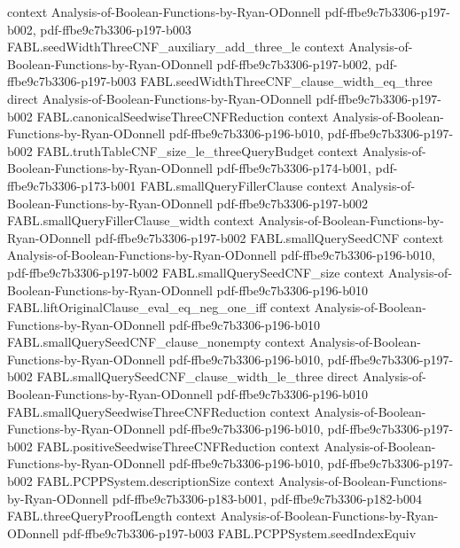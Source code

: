 \begin{theorem}
  {context}
  {Analysis-of-Boolean-Functions-by-Ryan-ODonnell}
  {pdf-ffbe9c7b3306-p197-b002,
    pdf-ffbe9c7b3306-p197-b003}
\proofstep
  {FABL.seedWidthThreeCNF_auxiliary_add_three_le}
  {context}
  {Analysis-of-Boolean-Functions-by-Ryan-ODonnell}
  {pdf-ffbe9c7b3306-p197-b002,
    pdf-ffbe9c7b3306-p197-b003}
\proofstep
  {FABL.seedWidthThreeCNF_clause_width_eq_three}
  {direct}
  {Analysis-of-Boolean-Functions-by-Ryan-ODonnell}
  {pdf-ffbe9c7b3306-p197-b002}
\proofstep
  {FABL.canonicalSeedwiseThreeCNFReduction}
  {context}
  {Analysis-of-Boolean-Functions-by-Ryan-ODonnell}
  {pdf-ffbe9c7b3306-p196-b010,
    pdf-ffbe9c7b3306-p197-b002}
\proofstep
  {FABL.truthTableCNF_size_le_threeQueryBudget}
  {context}
  {Analysis-of-Boolean-Functions-by-Ryan-ODonnell}
  {pdf-ffbe9c7b3306-p174-b001,
    pdf-ffbe9c7b3306-p173-b001}
\proofstep
  {FABL.smallQueryFillerClause}
  {context}
  {Analysis-of-Boolean-Functions-by-Ryan-ODonnell}
  {pdf-ffbe9c7b3306-p197-b002}
\proofstep
  {FABL.smallQueryFillerClause_width}
  {context}
  {Analysis-of-Boolean-Functions-by-Ryan-ODonnell}
  {pdf-ffbe9c7b3306-p197-b002}
\proofstep
  {FABL.smallQuerySeedCNF}
  {context}
  {Analysis-of-Boolean-Functions-by-Ryan-ODonnell}
  {pdf-ffbe9c7b3306-p196-b010,
    pdf-ffbe9c7b3306-p197-b002}
\proofstep
  {FABL.smallQuerySeedCNF_size}
  {context}
  {Analysis-of-Boolean-Functions-by-Ryan-ODonnell}
  {pdf-ffbe9c7b3306-p196-b010}
\proofstep
  {FABL.liftOriginalClause_eval_eq_neg_one_iff}
  {context}
  {Analysis-of-Boolean-Functions-by-Ryan-ODonnell}
  {pdf-ffbe9c7b3306-p196-b010}
\proofstep
  {FABL.smallQuerySeedCNF_clause_nonempty}
  {context}
  {Analysis-of-Boolean-Functions-by-Ryan-ODonnell}
  {pdf-ffbe9c7b3306-p196-b010,
    pdf-ffbe9c7b3306-p197-b002}
\proofstep
  {FABL.smallQuerySeedCNF_clause_width_le_three}
  {direct}
  {Analysis-of-Boolean-Functions-by-Ryan-ODonnell}
  {pdf-ffbe9c7b3306-p196-b010}
\proofstep
  {FABL.smallQuerySeedwiseThreeCNFReduction}
  {context}
  {Analysis-of-Boolean-Functions-by-Ryan-ODonnell}
  {pdf-ffbe9c7b3306-p196-b010,
    pdf-ffbe9c7b3306-p197-b002}
\proofstep
  {FABL.positiveSeedwiseThreeCNFReduction}
  {context}
  {Analysis-of-Boolean-Functions-by-Ryan-ODonnell}
  {pdf-ffbe9c7b3306-p196-b010,
    pdf-ffbe9c7b3306-p197-b002}
\proofstep
  {FABL.PCPPSystem.descriptionSize}
  {context}
  {Analysis-of-Boolean-Functions-by-Ryan-ODonnell}
  {pdf-ffbe9c7b3306-p183-b001,
    pdf-ffbe9c7b3306-p182-b004}
\proofstep
  {FABL.threeQueryProofLength}
  {context}
  {Analysis-of-Boolean-Functions-by-Ryan-ODonnell}
  {pdf-ffbe9c7b3306-p197-b003}
\proofstep
  {FABL.PCPPSystem.seedIndexEquiv}

\end{theorem}

